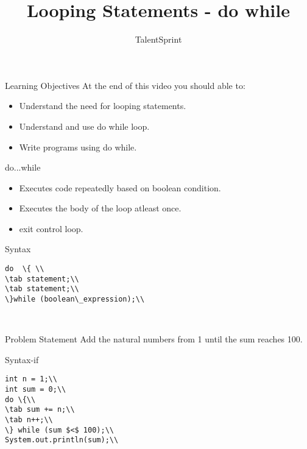 \documentclass[aspectratio=169,14pt,usenames,dvipsnames]{beamer}
\title[Looping Statements - do while]{Looping Statements - do while}
\newcommand\tab[1][1cm]{\hspace*{#1}}
\begin{document}
{\1
\begin{frame} \vspace{35pt}

\subtitle{TalentSprint}
\maketitle
\end{frame}
}


\begin{frame}{Learning Objectives}
At the end of this video you should able to:
\begin{itemize}
\item Understand the need for looping
statements.
\item Understand and use do while loop.
\item Write programs using do while.
\end{itemize}
\end{frame}


\begin{frame}{do...while}
\begin{itemize}
    \item Executes code repeatedly based on boolean
condition.
    \item Executes the body of the loop atleast once.
    \item exit control loop. 
\end{itemize}
\end{frame}



\begin{frame}{Syntax}
\begin{lstlisting}
do  \{ \\
\tab statement;\\
\tab statement;\\
\}while (boolean\_expression);\\
\end{lstlisting}\\

\end{frame}



\begin{frame}{Problem Statement}
Add the natural numbers from 1 until the sum
reaches 100.
\end{frame}

\begin{frame}{Syntax-if}
\begin{lstlisting}
int n = 1;\\
int sum = 0;\\
do \{\\
\tab sum += n;\\
\tab n++;\\
\} while (sum $<$ 100);\\
System.out.println(sum);\\
\end{lstlisting}\\
\end{frame}
\end{document}
